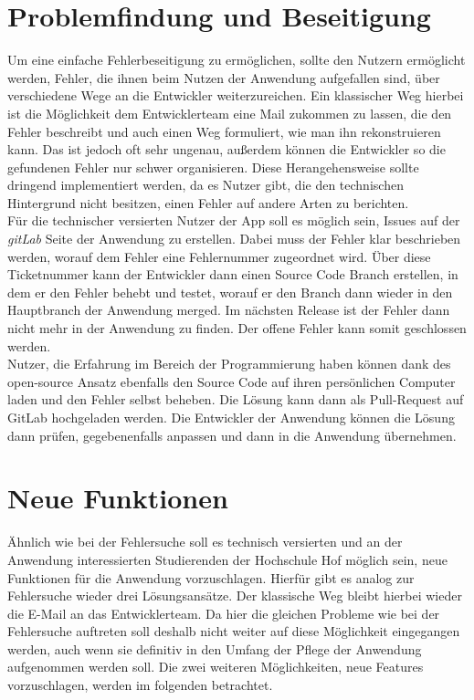 \section{Problemfindung und Beseitigung}
\label{sec:bugbounty}

Um eine einfache Fehlerbeseitigung zu ermöglichen, sollte den Nutzern ermöglicht werden, Fehler, die ihnen beim Nutzen der Anwendung aufgefallen sind, über verschiedene Wege an die Entwickler weiterzureichen. Ein klassischer Weg hierbei ist die Möglichkeit dem Entwicklerteam eine Mail zukommen zu lassen, die den Fehler beschreibt und auch einen Weg formuliert, wie man ihn rekonstruieren kann. Das ist jedoch oft sehr ungenau, außerdem können die Entwickler so die gefundenen Fehler nur schwer organisieren. Diese Herangehensweise sollte dringend implementiert werden, da es Nutzer gibt, die den technischen Hintergrund nicht besitzen, einen Fehler auf andere Arten zu berichten.\\
\linebreak
Für die technischer versierten Nutzer der \ac{App} soll es möglich sein, Issues auf der \textit{gitLab} Seite der Anwendung zu erstellen. Dabei muss der Fehler klar beschrieben werden, worauf dem Fehler eine Fehlernummer zugeordnet wird. Über diese Ticketnummer kann der Entwickler dann einen Source Code Branch erstellen, in dem er den Fehler behebt und testet, worauf er den Branch dann wieder in den Hauptbranch der Anwendung merged. Im nächsten Release ist der Fehler dann nicht mehr in der Anwendung zu finden. Der offene Fehler kann somit geschlossen werden.\\
\linebreak
Nutzer, die Erfahrung im Bereich der Programmierung haben können dank des open-source Ansatz ebenfalls den Source Code auf ihren persönlichen Computer laden und den Fehler selbst beheben. Die Lösung kann dann als Pull-Request auf GitLab hochgeladen werden. Die Entwickler der Anwendung können die Lösung dann prüfen, gegebenenfalls anpassen und dann in die Anwendung übernehmen.

\section{Neue Funktionen}
\label{sec:feature_requests}

Ähnlich wie bei der Fehlersuche soll es technisch versierten und an der Anwendung interessierten Studierenden der Hochschule Hof möglich sein, neue Funktionen für die Anwendung vorzuschlagen. Hierfür gibt es analog zur Fehlersuche wieder drei Lösungsansätze. Der klassische Weg bleibt hierbei wieder die E-Mail an das Entwicklerteam. Da hier die gleichen Probleme wie bei der Fehlersuche auftreten soll deshalb nicht weiter auf diese Möglichkeit eingegangen werden, auch wenn sie definitiv in den Umfang der Pflege der Anwendung aufgenommen werden soll. Die zwei weiteren Möglichkeiten, neue Features vorzuschlagen, werden im folgenden betrachtet.

